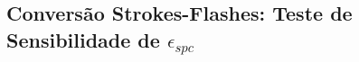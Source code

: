 \begin{anexosenv}

\partanexos

\chapter{Conversão Strokes-Flashes: Teste de Sensibilidade de $\epsilon_{spc}$}
\label{anexo_conversao}
\lipsum[30]


\end{anexosenv}
